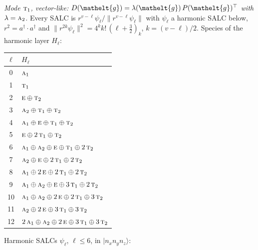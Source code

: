 \documentclass[11pt]{article}
\newcommand{\eltfont}[1]{{\let\sigma\eltsigma\mathelt{#1}}}
\newcommand{\irr}[1]{\text{\normalfont\scshape #1}}
\newcommand{\elt}[1]{\eltfont{#1}}
\newcommand{\occ}[1]{\lvert #1\rangle}
\newcommand{\gel}{\elt{g}}             %
\newcommand{\gmat}{P(\gel)^{\top}}     %
\begin{document}
\emph{Mode $\irr{t}_{1}$, vector-like: $D(\gel)=\lambda(\gel)\,\gmat$ with $\lambda=\irr{a}_{2}$.} Every SALC is $r^{v-\ell}\psi_\ell/\lVert r^{v-\ell}\psi_\ell\rVert$ with $\psi_\ell$ a harmonic SALC below, $r^2=a^\dagger\!\cdot a^\dagger$ and $\lVert r^{2k}\psi_\ell\rVert^2=4^kk!\,(\ell+\tfrac32)_k$, $k=(v-\ell)/2$. Species of the harmonic layer $H_\ell$:
\begin{longtable}{c l}\hline $\ell$ & $H_\ell$\\ \hline\endhead
0 & $\irr{a}_{1}$\\
1 & $\irr{t}_{1}$\\
2 & $\irr{e}\oplus \irr{t}_{2}$\\
3 & $\irr{a}_{2}\oplus \irr{t}_{1}\oplus \irr{t}_{2}$\\
4 & $\irr{a}_{1}\oplus \irr{e}\oplus \irr{t}_{1}\oplus \irr{t}_{2}$\\
5 & $\irr{e}\oplus 2\,\irr{t}_{1}\oplus \irr{t}_{2}$\\
6 & $\irr{a}_{1}\oplus \irr{a}_{2}\oplus \irr{e}\oplus \irr{t}_{1}\oplus 2\,\irr{t}_{2}$\\
7 & $\irr{a}_{2}\oplus \irr{e}\oplus 2\,\irr{t}_{1}\oplus 2\,\irr{t}_{2}$\\
8 & $\irr{a}_{1}\oplus 2\,\irr{e}\oplus 2\,\irr{t}_{1}\oplus 2\,\irr{t}_{2}$\\
9 & $\irr{a}_{1}\oplus \irr{a}_{2}\oplus \irr{e}\oplus 3\,\irr{t}_{1}\oplus 2\,\irr{t}_{2}$\\
10 & $\irr{a}_{1}\oplus \irr{a}_{2}\oplus 2\,\irr{e}\oplus 2\,\irr{t}_{1}\oplus 3\,\irr{t}_{2}$\\
11 & $\irr{a}_{2}\oplus 2\,\irr{e}\oplus 3\,\irr{t}_{1}\oplus 3\,\irr{t}_{2}$\\
12 & $2\,\irr{a}_{1}\oplus \irr{a}_{2}\oplus 2\,\irr{e}\oplus 3\,\irr{t}_{1}\oplus 3\,\irr{t}_{2}$\\
\hline\end{longtable}
Harmonic SALCs $\psi_\ell$, $\ell\le6$, in $\occ{n_xn_yn_z}$:
\end{document}
